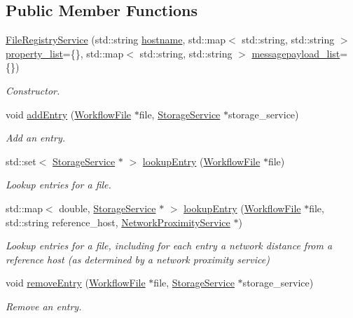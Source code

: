 \subsection*{Public Member Functions}
\begin{DoxyCompactItemize}
\item 
\hyperlink{classwrench_1_1_file_registry_service_ab5b1061fc26163f291e905c27bdbf114}{File\+Registry\+Service} (std\+::string \hyperlink{classwrench_1_1_s4_u___daemon_a52bc0b9a6cd248310749dac086819f00}{hostname}, std\+::map$<$ std\+::string, std\+::string $>$ \hyperlink{classwrench_1_1_service_a032143b1e2d7296dde9b4ca1e34845ce}{property\+\_\+list}=\{\}, std\+::map$<$ std\+::string, std\+::string $>$ \hyperlink{classwrench_1_1_service_a63865f20c92027ab626ab1347b0099d2}{messagepayload\+\_\+list}=\{\})
\begin{DoxyCompactList}\small\item\em Constructor. \end{DoxyCompactList}\item 
void \hyperlink{classwrench_1_1_file_registry_service_a6c630119b5168fa84ea923217ee02243}{add\+Entry} (\hyperlink{classwrench_1_1_workflow_file}{Workflow\+File} $\ast$file, \hyperlink{classwrench_1_1_storage_service}{Storage\+Service} $\ast$storage\+\_\+service)
\begin{DoxyCompactList}\small\item\em Add an entry. \end{DoxyCompactList}\item 
std\+::set$<$ \hyperlink{classwrench_1_1_storage_service}{Storage\+Service} $\ast$ $>$ \hyperlink{classwrench_1_1_file_registry_service_a380277028177601cd601c8d8603d47f6}{lookup\+Entry} (\hyperlink{classwrench_1_1_workflow_file}{Workflow\+File} $\ast$file)
\begin{DoxyCompactList}\small\item\em Lookup entries for a file. \end{DoxyCompactList}\item 
std\+::map$<$ double, \hyperlink{classwrench_1_1_storage_service}{Storage\+Service} $\ast$ $>$ \hyperlink{classwrench_1_1_file_registry_service_a729671ba5d3f3d0da7f3e15058515aa7}{lookup\+Entry} (\hyperlink{classwrench_1_1_workflow_file}{Workflow\+File} $\ast$file, std\+::string reference\+\_\+host, \hyperlink{classwrench_1_1_network_proximity_service}{Network\+Proximity\+Service} $\ast$)
\begin{DoxyCompactList}\small\item\em Lookup entries for a file, including for each entry a network distance from a reference host (as determined by a network proximity service) \end{DoxyCompactList}\item 
void \hyperlink{classwrench_1_1_file_registry_service_a3e5d8d7503c2d3ad422b35c598647d82}{remove\+Entry} (\hyperlink{classwrench_1_1_workflow_file}{Workflow\+File} $\ast$file, \hyperlink{classwrench_1_1_storage_service}{Storage\+Service} $\ast$storage\+\_\+service)
\begin{DoxyCompactList}\small\item\em Remove an entry. \end{DoxyCompactList}\end{DoxyCompactItemize}
